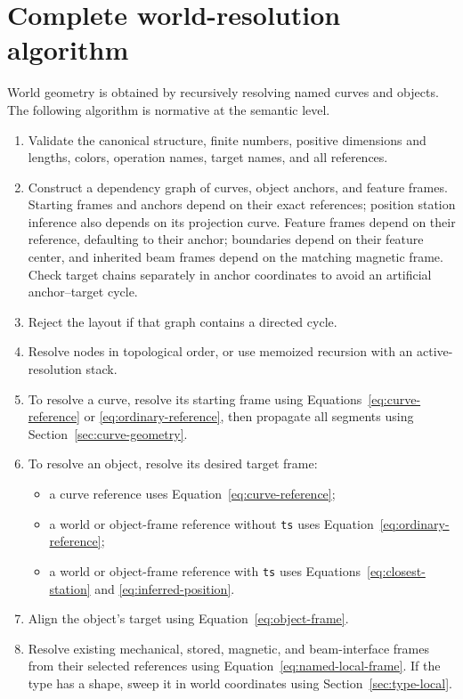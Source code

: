 \documentclass[11pt,a4paper]{article}
\begin{document}
\section{Complete world-resolution algorithm}
\label{sec:resolution-algorithm}

World geometry is obtained by recursively resolving named curves and objects.
The following algorithm is normative at the semantic level.

\begin{enumerate}
  \item Validate the canonical structure, finite numbers, positive dimensions
        and lengths, colors, operation names, target names, and all references.
  \item Construct a dependency graph of curves, object anchors, and feature
        frames. Starting frames and anchors depend on their exact references;
        position station inference also depends on its projection curve.
        Feature frames depend on their reference, defaulting to their anchor;
        boundaries depend on their feature center, and inherited beam frames
        depend on the matching magnetic frame. Check target chains separately
        in anchor coordinates to avoid an artificial anchor--target cycle.
  \item Reject the layout if that graph contains a directed cycle.
  \item Resolve nodes in topological order, or use memoized recursion with an
        active-resolution stack.
  \item To resolve a curve, resolve its starting frame using
        Equations~\eqref{eq:curve-reference} or
        \eqref{eq:ordinary-reference}, then propagate all segments using
        Section~\ref{sec:curve-geometry}.
  \item To resolve an object, resolve its desired target frame:
        \begin{itemize}
          \item a curve reference uses Equation~\eqref{eq:curve-reference};
          \item a world or object-frame reference without \texttt{ts} uses
                Equation~\eqref{eq:ordinary-reference};
          \item a world or object-frame reference with \texttt{ts} uses
                Equations~\eqref{eq:closest-station} and
                \eqref{eq:inferred-position}.
        \end{itemize}
  \item Align the object's target using Equation~\eqref{eq:object-frame}.
  \item Resolve existing mechanical, stored, magnetic, and beam-interface
        frames from their selected references using Equation~\eqref{eq:named-local-frame}.  If the type has a
        shape, sweep it in world coordinates using
        Section~\ref{sec:type-local}.
\end{enumerate}
\end{document}

